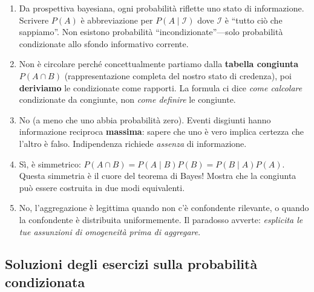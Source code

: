 \documentclass[
  italian,
  letterpaper,
  a4paper,
  11pt,
  open=any]{scrbook}
\theoremstyle{plain}
\theoremstyle{definition}
\theoremstyle{definition}
\theoremstyle{remark}
\begin{document}
\begin{tcolorbox}
\begin{enumerate}
\def\labelenumi{\arabic{enumi}.}
\item
  Da prospettiva bayesiana, ogni probabilità riflette uno stato di
  informazione. Scrivere \(P(A)\) è abbreviazione per
  \(P(A \mid \mathcal{I})\) dove \(\mathcal{I}\) è ``tutto ciò che
  sappiamo''. Non esistono probabilità ``incondizionate''---solo
  probabilità condizionate allo sfondo informativo corrente.
\item
  Non è circolare perché concettualmente partiamo dalla \textbf{tabella
  congiunta} \(P(A \cap B)\) (rappresentazione completa del nostro stato
  di credenza), poi \textbf{deriviamo} le condizionate come rapporti. La
  formula ci dice \emph{come calcolare} condizionate da congiunte, non
  \emph{come definire} le congiunte.
\item
  No (a meno che uno abbia probabilità zero). Eventi disgiunti hanno
  informazione reciproca \textbf{massima}: sapere che uno è vero implica
  certezza che l'altro è falso. Indipendenza richiede \emph{assenza} di
  informazione.
\item
  Sì, è simmetrico:
  \(P(A \cap B) = P(A \mid B) P(B) = P(B \mid A) P(A)\). Questa
  simmetria è il cuore del teorema di Bayes! Mostra che la congiunta può
  essere costruita in due modi equivalenti.
\item
  No, l'aggregazione è legittima quando non c'è confondente rilevante, o
  quando la confondente è distribuita uniformemente. Il paradosso
  avverte: \emph{esplicita le tue assunzioni di omogeneità prima di
  aggregare}.
\end{enumerate}

\subsection*{Soluzioni degli esercizi sulla probabilità
condizionata}\label{soluzioni-degli-esercizi-sulla-probabilituxe0-condizionata}


\end{tcolorbox}
\end{document}
